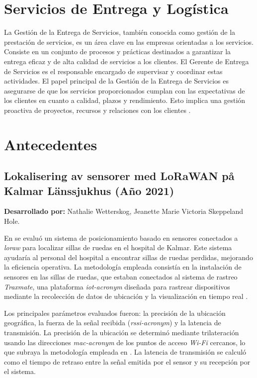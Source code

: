 \section{Servicios de Entrega y Logística}

La Gestión de la Entrega de Servicios, también conocida como gestión de la prestación de servicios, es un área clave en las empresas orientadas a los servicios. Consiste en un conjunto de procesos y prácticas destinados a garantizar la entrega eficaz y de alta calidad de servicios a los clientes. El Gerente de Entrega de Servicios es el responsable encargado de supervisar y coordinar estas actividades. El papel principal de la Gestión de la Entrega de Servicios es asegurarse de que los servicios proporcionados cumplan con las expectativas de los clientes en cuanto a calidad, plazos y rendimiento. Esto implica una gestión proactiva de proyectos, recursos y relaciones con los clientes \cite{gestion}.














\section{Antecedentes}

\subsection{Lokalisering av sensorer med LoRaWAN på Kalmar Länssjukhus (Año 2021)}
\textbf{Desarrollado por:} Nathalie Wetterskog, Jeanette Marie Victoria Skeppeland Hole.

En \cite{SkepplandHole2021} se evaluó un sistema de posicionamiento basado en sensores conectados a \textit{\acrshort{loraw}} para localizar sillas de ruedas en el hospital de Kalmar. Este sistema ayudaría al personal del hospital a encontrar sillas de ruedas perdidas, mejorando la eficiencia operativa. La metodología empleada consistía en la instalación de sensores en las sillas de ruedas, que estaban conectados al sistema de rastreo \textit{Traxmate}, una plataforma \textit{\acrshort{iot-acronym}} diseñada para rastrear dispositivos mediante la recolección de datos de ubicación y la visualización en tiempo real \cite{SkepplandHole2021}. 

Los principales parámetros evaluados fueron: la precisión de la ubicación geográfica, la fuerza de la señal recibida (\textit{\acrshort{rssi-acronym}}) y la latencia de transmisión. La precisión de la ubicación se determinó mediante trilateración usando las direcciones \textit{\acrshort{mac-acronym}} de los puntos de acceso \textit{Wi-Fi} cercanos, lo que subraya la metodología empleada en \cite{SkepplandHole2021}. La latencia de transmisión se calculó como el tiempo de retraso entre la señal emitida por el sensor y su recepción por el sistema.

